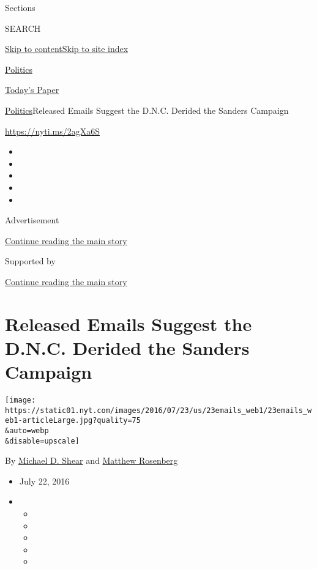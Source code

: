 Sections

SEARCH

\protect\hyperlink{site-content}{Skip to
content}\protect\hyperlink{site-index}{Skip to site index}

\href{https://www.nytimes.com/section/politics}{Politics}

\href{https://myaccount.nytimes.com/auth/login?response_type=cookie\&client_id=vi}{}

\href{https://www.nytimes.com/section/todayspaper}{Today's Paper}

\href{/section/politics}{Politics}\textbar{}Released Emails Suggest the
D.N.C. Derided the Sanders Campaign

\url{https://nyti.ms/2agXa6S}

\begin{itemize}
\item
\item
\item
\item
\item
\end{itemize}

Advertisement

\protect\hyperlink{after-top}{Continue reading the main story}

Supported by

\protect\hyperlink{after-sponsor}{Continue reading the main story}

\hypertarget{released-emails-suggest-the-dnc-derided-the-sanders-campaign}{%
\section{Released Emails Suggest the D.N.C. Derided the Sanders
Campaign}\label{released-emails-suggest-the-dnc-derided-the-sanders-campaign}}

\texttt{[image: https://static01.nyt.com/images/2016/07/23/us/23emails\_web1/23emails\_web1-articleLarge.jpg?quality=75\\\&auto=webp\\\&disable=upscale]}

By \href{http://www.nytimes.com/by/michael-d-shear}{Michael D. Shear}
and \href{http://www.nytimes.com/by/matthew-rosenberg}{Matthew
Rosenberg}

\begin{itemize}
\item
  July 22, 2016
\item
  \begin{itemize}
  \item
  \item
  \item
  \item
  \item
  \end{itemize}
\end{itemize}

